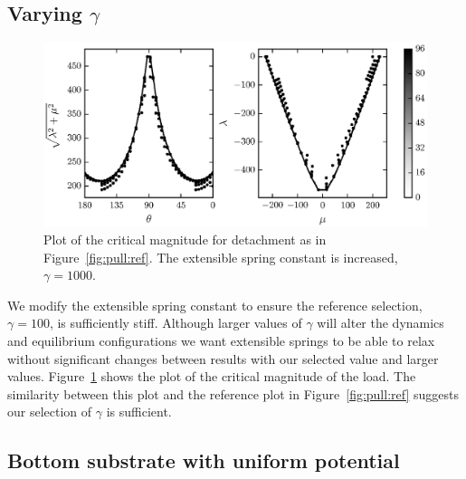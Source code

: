 \subsection{Varying $\gamma$}

   \begin{figure}[t]
      \begin{center}
         \includegraphics{./fig/ch3/pull/g1000/grid.eps}
      \end{center}      
      \caption{Plot of the critical magnitude for detachment as in Figure~\ref{fig:pull:ref}. The extensible spring constant is increased, $\gamma=1000$.
      \label{fig:pull:g1000}}
   \end{figure}

We modify the extensible spring constant to ensure the reference selection, $\gamma=100$, is sufficiently stiff. Although larger values of $\gamma$ will alter the dynamics and equilibrium configurations we want extensible springs to be able to relax without significant changes between results with our selected value and larger values. Figure~\ref{fig:pull:g1000} shows the plot of the critical magnitude of the load. The similarity between this plot and the reference plot in Figure~\ref{fig:pull:ref} suggests our selection of $\gamma$ is sufficient.


\subsection{Bottom substrate with uniform potential} \label{section:detachment:pressure}


